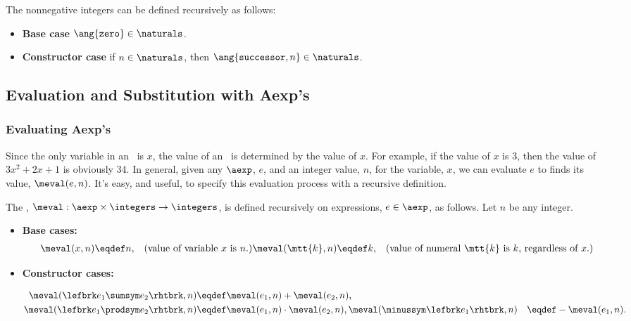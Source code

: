\begin{definition}
The nonnegative integers can be defined recursively as follows:

\begin{definition}\label{tagn}
\begin{itemize}
\item \textbf{Base case}  $\ang{\texttt{zero}}\in \naturals$.
\item \textbf{Constructor case} if $n \in \naturals$, then
      $\ang{\texttt{successor},n}\in \naturals$.
\end{itemize}

\end{definition}
\fi

\subsection{Evaluation and Substitution with Aexp's}

\subsubsection{Evaluating Aexp's}

Since the only variable in an \aexp\ is $x$, the value of an \aexp\ is
determined by the value of $x$.  For example, if the value of $x$ is 3,
then the value of $3x^2 + 2x + 1$ is obviously 34.  In general, given any
$\aexp$, $e$, and an integer value, $n$, for the variable, $x$, we can
evaluate $e$ to finds its value, $\meval(e,n)$.  It's easy, and useful, to
specify this evaluation process with a recursive definition.

\begin{definition}\label{meval-def}
  The , $\meval: \aexp \times \integers \to
  \integers$, is defined recursively on expressions, $e \in \aexp$, as
  follows.  Let $n$ be any integer.

\begin{itemize}
\item \textbf{Base cases:}
\begin{align*}
\meval(x, n) & \eqdef n,
    & \text{(value of variable $x$ is $n$.)}\label{eval-var}
\meval(\mtt{k}, n) & \eqdef k, 
   & \text{(value of numeral $\mtt{k}$ is $k$, regardless of $x$.)}\label{eval-const}
\end{align*}

\item \textbf{Constructor cases:}

\begin{align*}
\meval(\lefbrk e_1 \sumsym e_2 \rhtbrk,n)
   & \eqdef \meval(e_1,n)+\meval(e_2,n),\label{eval-sum}\\
\meval(\lefbrk e_1 \prodsym e_2 \rhtbrk,n)
  & \eqdef \meval(e_1,n) \cdot \meval(e_2,n), \label{eval-prod}
\meval(\minussym\lefbrk e_1 \rhtbrk,n) 
  &  \eqdef - \meval(e_1,n). \label{eval-minus}
\end{align*}
\end{itemize}


\end{definition}
\end{definition}
